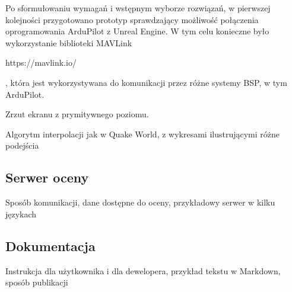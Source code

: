 Po sformułowaniu wymagań i wstępnym wyborze rozwiązań, w pierwszej kolejności przygotowano prototyp sprawdzający możliwość połączenia oprogramowania ArduPilot z Unreal Engine. W tym celu konieczne było wykorzystanie biblioteki MAVLink \begin{todo}https://mavlink.io/\end{todo}, która jest wykorzystywana do komunikacji przez różne systemy BSP, w tym ArduPilot.

\begin{todo}
    Zrzut ekranu z prymitywnego poziomu.
\end{todo}

\begin{todo}
    Algorytm interpolacji jak w Quake World, z wykresami ilustrującymi różne podejścia
\end{todo}

\subsection{Serwer oceny}
\begin{todo}
    Sposób komunikacji, dane dostępne do oceny, przykładowy serwer w kilku językach
\end{todo}

\subsection{Dokumentacja}
\begin{todo}
    Instrukcja dla użytkownika i dla dewelopera, przykład tekstu w Markdown, sposób publikacji
\end{todo}